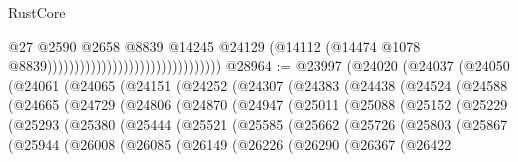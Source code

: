 \begin{lexlean}{RustCore}
\begin{coremodule}
                                                                @27
                                                                @2590
                                                                @2658
                                                                @8839
                                                                @14245
                                                                @24129
                                                                (@14112
                                                                  (@14474
                                                                    @1078
                                                                    @8839))))))))))))))))))))))))))))))))
@28964 := @23997
    (@24020
      (@24037
        (@24050
          (@24061
            (@24065
              (@24151
                (@24252
                  (@24307
                    (@24383
                      (@24438
                        (@24524
                          (@24588
                            (@24665
                              (@24729
                                (@24806
                                  (@24870
                                    (@24947
                                      (@25011
                                        (@25088
                                          (@25152
                                            (@25229
                                              (@25293
                                                (@25380
                                                  (@25444
                                                    (@25521
                                                      (@25585
                                                        (@25662
                                                          (@25726
                                                            (@25803
                                                              (@25867
                                                                (@25944
                                                                  (@26008
                                                                    (@26085
                                                                      (@26149
                                                                        (@26226
                                                                          (@26290
                                                                            (@26367
                                                                              (@26422

\end{coremodule}
\end{lexlean}

